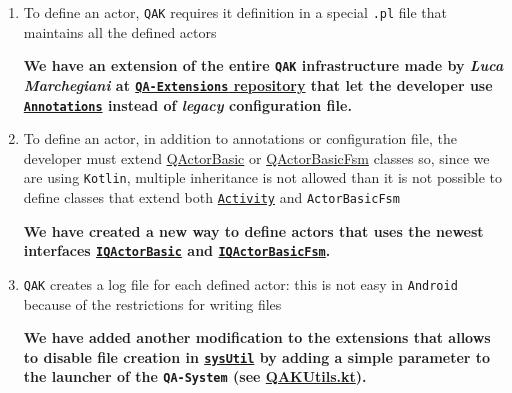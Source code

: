 \begin{enumerate}
	\item To define an actor, \texttt{QAK} requires it definition in a special \texttt{.pl} file that maintains all the defined actors
	\begin{tcolorbox}
		\begin{center}
			\textbf{We have an extension of the entire \texttt{QAK} infrastructure made by \textit{Luca Marchegiani} at \href{https://github.com/LM-96/QA-Extensions}{\texttt{QA-Extensions} repository} that let the developer use \href{https://kotlinlang.org/docs/annotations.html}{\texttt{Annotations}} instead of \textit{legacy} configuration file.}
		\end{center}
	\end{tcolorbox}

	\item  To define an actor, in addition to annotations or configuration file, the developer must extend \href{https://github.com/LM-96/QA-Extensions/blob/main/it.unibo.qakactor/src/main/kotlin/QActorBasic.kt}{QActorBasic} or \href{https://github.com/LM-96/QA-Extensions/blob/main/it.unibo.qakactor/src/main/kotlin/QActorBasicFsm.kt}{QActorBasicFsm} classes so, since we are using \texttt{Kotlin}, multiple inheritance is not allowed than it is not possible to define classes that extend both \href{https://developer.android.com/reference/android/app/Activity}{\texttt{Activity}} and \texttt{ActorBasicFsm}
	\begin{tcolorbox}
		\begin{center}
			\textbf{We have created a new way to define actors that uses the newest interfaces \href{https://github.com/LM-96/QA-Extensions/blob/android/it.unibo.qakactor/src/main/kotlin/IQActorBasic.kt}{\texttt{IQActorBasic}} and \href{https://github.com/LM-96/QA-Extensions/blob/android/it.unibo.qakactor/src/main/kotlin/IQActorBasicFsm.kt}{\texttt{IQActorBasicFsm}}.}
		\end{center}
	\end{tcolorbox}

	\item \texttt{QAK} creates a log file for each defined actor: this is not easy in \texttt{Android} because of the restrictions for writing files
	\begin{tcolorbox}
		\begin{center}
			\textbf{We have added another modification to the extensions that allows to disable file creation in \href{https://github.com/LM-96/QA-Extensions/blob/android/it.unibo.qakactor/src/main/kotlin/sysUtil.kt}{\texttt{sysUtil}} by adding a simple parameter to the launcher of the \texttt{QA-System} (see \href{https://github.com/LucaLand/MobileSystemsProject-LL/blob/0.9.1/app/src/main/java/it/unibo/mobilesystems/actors/QAKUtils.kt}{QAKUtils.kt}).}
		\end{center}
	\end{tcolorbox}
	
\end{enumerate}

